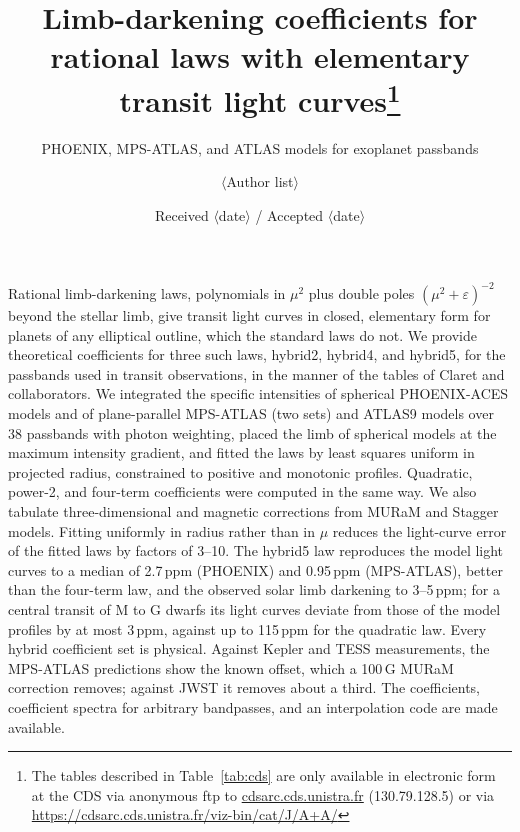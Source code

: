 \documentclass{aa}
\newcommand{\ppm}{\,\textrm{ppm}}
\begin{document}
\title{Limb-darkening coefficients for rational laws with elementary transit
light curves\thanks{The tables described in Table~\ref{tab:cds} are only
available in electronic form at the CDS via anonymous ftp to
\url{cdsarc.cds.unistra.fr} (130.79.128.5) or via
\url{https://cdsarc.cds.unistra.fr/viz-bin/cat/J/A+A/}}}
\subtitle{PHOENIX, MPS-ATLAS, and ATLAS models for exoplanet passbands}

\author{$\langle$Author list$\rangle$}


\date{Received $\langle$date$\rangle$ / Accepted $\langle$date$\rangle$}

\abstract
{Rational limb-darkening laws, polynomials in $\mu^2$ plus double poles
$(\mu^2+\varepsilon)^{-2}$ beyond the stellar limb, give transit light curves in
closed, elementary form for planets of any elliptical outline, which the
standard laws do not.}
{We provide theoretical coefficients for three such laws, hybrid2, hybrid4, and
hybrid5, for the passbands used in transit observations, in the manner of the
tables of Claret and collaborators.}
{We integrated the specific intensities of spherical PHOENIX-ACES models and of
plane-parallel MPS-ATLAS (two sets) and ATLAS9 models over 38 passbands with
photon weighting, placed the limb of spherical models at the maximum intensity
gradient, and fitted the laws by least squares uniform in projected radius,
constrained to positive and monotonic profiles. Quadratic, power-2, and
four-term coefficients were computed in the same way. We also tabulate
three-dimensional and magnetic corrections from MURaM and Stagger models.}
{Fitting uniformly in radius rather than in $\mu$ reduces the light-curve error
of the fitted laws by factors of 3--10. The hybrid5 law reproduces the model
light curves to a median of 2.7\ppm{} (PHOENIX) and 0.95\ppm{} (MPS-ATLAS),
better than the four-term law, and the observed solar limb darkening to
3--5\ppm; for a central transit of M to G dwarfs its light curves deviate from
those of the model profiles by at most 3\ppm, against up to 115\ppm{} for the
quadratic law. Every hybrid coefficient set is physical. Against Kepler and TESS
measurements, the MPS-ATLAS predictions show the known offset, which a 100\,G
MURaM correction removes; against JWST it removes about a third.}
{The coefficients, coefficient spectra for arbitrary bandpasses, and an
interpolation code are made available.}
\end{document}
